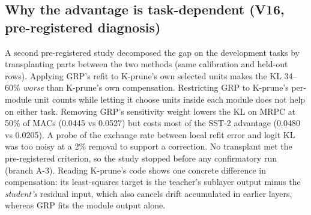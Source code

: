 \documentclass[11pt]{article}
\begin{document}
\subsection{Why the advantage is task-dependent (V16, pre-registered diagnosis)}\label{sec:v16}
A second pre-registered study decomposed the gap on the development tasks by transplanting parts between the two
methods (same calibration and held-out rows). Applying GRP's refit to K-prune's own selected units makes the KL 34--60\%
\emph{worse} than K-prune's own compensation. Restricting GRP to K-prune's per-module unit counts while letting it choose
units inside each module does not help on either task. Removing GRP's sensitivity weight lowers the KL on MRPC at 50\%
of MACs (0.0445 vs 0.0527) but costs most of the SST-2 advantage (0.0480 vs 0.0205). A probe of the exchange rate
between local refit error and logit KL was too noisy at a 2\% removal to support a correction. No transplant met the
pre-registered criterion, so the study stopped before any confirmatory run (branch A-3). Reading K-prune's code shows one
concrete difference in compensation: its least-squares target is the teacher's sublayer output minus the
\emph{student's} residual input, which also cancels drift accumulated in earlier layers, whereas GRP fits the
module output alone.
\end{document}
